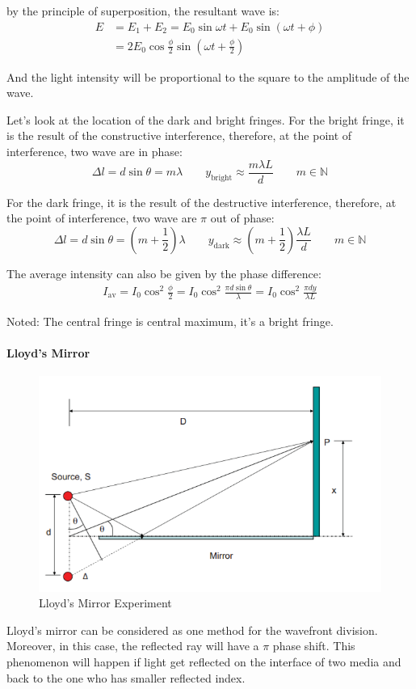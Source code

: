 \documentclass[UTF8]{book}
\begin{document}
by the principle of superposition, the resultant wave is:
\begin{align*}
E&=E_1+E_2=E_0\sin \omega t+E_0\sin (\omega t+\phi )\\
&=2E_0\cos \frac{\phi}{2}\sin \left(\omega t+\frac{\phi}{2}\right)
\end{align*}

And the light intensity will be proportional to the square to the amplitude of the wave. 

Let's look at the location of the dark and bright fringes. For the bright fringe, it is the result of the constructive interference, therefore, at the point of interference, two wave are in phase:
\[\Delta l=d\sin \theta =m\lambda\qquad y_{\textrm{bright}}\approx \frac{m\lambda L}{d} \qquad m\in \mathbb{N}\]

For the dark fringe, it is the result of the destructive interference, therefore, at the point of interference, two wave are $\pi $ out of phase:
\[\Delta l=d\sin \theta =\left(m+\frac{1}{2}\right)\lambda \qquad y_{\textrm{dark}}\approx \left(m+\frac{1}{2}\right)\frac{\lambda L}{d} \qquad m\in \mathbb{N}\]

The average intensity can also be given by the phase difference:
\begin{align*}
I_{\textrm{av}}=I_0\cos ^2\frac{\phi}{2}=I_0\cos ^2 \frac{\pi d\sin \theta}{\lambda}=I_0\cos ^2 \frac{\pi d y}{\lambda L}
\end{align*}

Noted: The central fringe is central maximum, it's a bright fringe.

\paragraph{Lloyd's Mirror}
\begin{figure}[H]
\centering
\label{fig:18}
\includegraphics[scale=0.8]{Figure/18.PNG}
\caption{Lloyd's Mirror Experiment}
\end{figure}
Lloyd's mirror can be considered as one method for the wavefront division. Moreover, in this case, the reflected ray will have a $\pi $ phase shift. This phenomenon will happen if light get reflected on the interface of two media and back to the one who has smaller reflected index.
\end{document}
